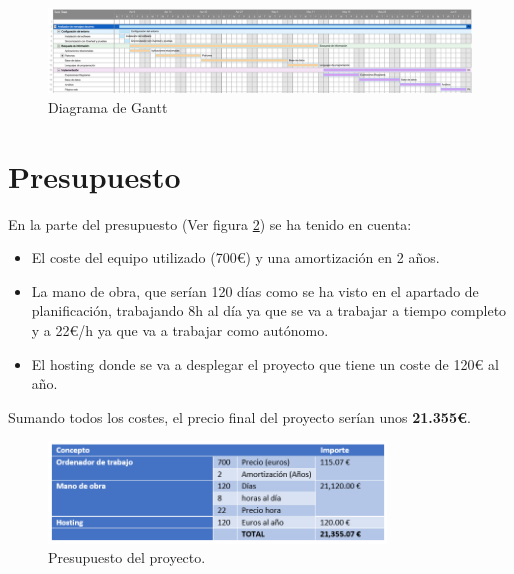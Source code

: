 \begin{figure}[htb]
    \centering
    \includegraphics[width=\textwidth]{imagenes/Diagrama_Gann.png}
\caption{Diagrama de Gantt}
\label{fig:Gantt}
\end{figure}

\section{Presupuesto}

En la parte del presupuesto (Ver figura \ref{fig:Presupuesto}) se ha tenido en cuenta:
\begin{itemize}
    \item El coste del equipo utilizado (700€) y una amortización en 2 años.
    \item La mano de obra, que serían 120 días como se ha visto en el apartado de planificación, trabajando 8h al día ya que se va a trabajar a tiempo completo y a 22€/h ya que va a trabajar como autónomo.
    \item El hosting donde se va a desplegar el proyecto que tiene un coste de 120€ al año.
\end{itemize}

Sumando todos los costes, el precio final del proyecto serían unos \textbf{21.355€}.

\begin{figure}[htb]
    \centering
    \includegraphics[width=0.8\textwidth]{imagenes/Presupuesto.png}
\caption{Presupuesto del proyecto.}
\label{fig:Presupuesto}
\end{figure}